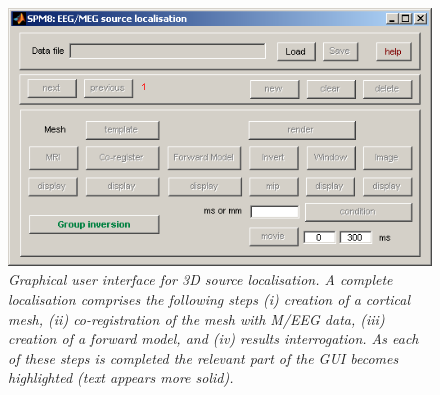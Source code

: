 \begin{figure}
\begin{center}
\includegraphics[width=120mm]{mmn/source_gui}
\caption{\em Graphical user interface for 3D source localisation. A complete localisation comprises the following steps (i) creation of a cortical mesh, (ii) co-registration of the mesh with M/EEG data, (iii) creation of a forward model, and (iv) results interrogation. As each of these steps is completed the relevant part of the GUI becomes highlighted (text appears more solid).
\label{source_gui}}
\end{center}
\end{figure}

